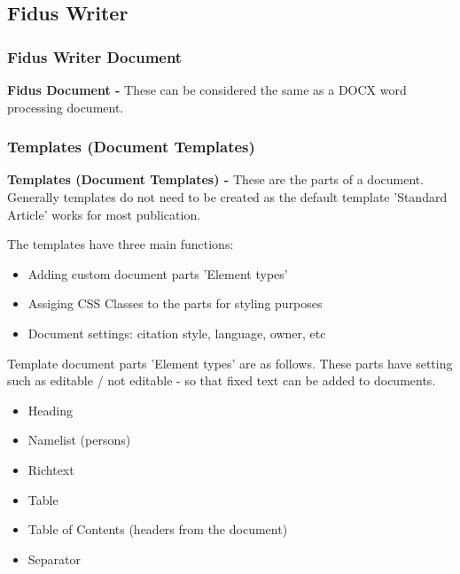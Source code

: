 \documentclass{article}
\begin{document}
\subsection{Fidus Writer}\label{H3001239}



\subsubsection{Fidus Writer Document}\label{H5931126}



\textbf{Fidus Document -} These can be considered the same as a DOCX word processing document.


\subsubsection{Templates (Document Templates)}\label{H364719}



\textbf{Templates (Document Templates) -} These are the parts of a document. Generally templates do not need to be created as the default template 'Standard Article' works for most publication.


The templates have three main functions:

\begin{itemize}
\item Adding custom document parts 'Element types'


\item Assiging CSS Classes to the parts for styling purposes


\item Document settings: citation style, language, owner, etc


\end{itemize}

Template document parts 'Element types' are as follows. These parts have setting such as editable / not editable - so that fixed text can be added to documents.

\begin{itemize}
\item Heading


\item Namelist (persons)


\item Richtext


\item Table


\item Table of Contents (headers from the document)


\item Separator


\end{itemize}
\end{document}
